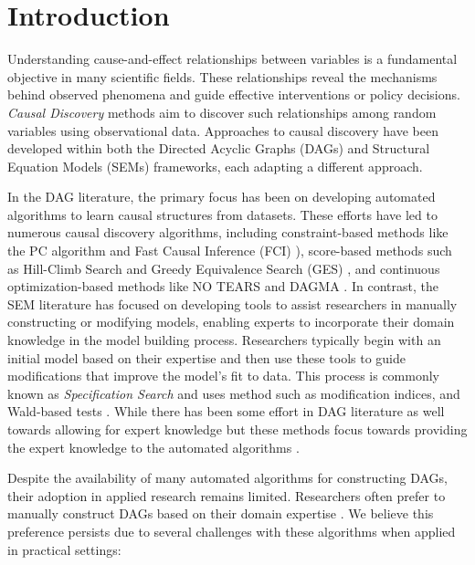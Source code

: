 \documentclass{uai2025} %
\begin{document}
\section{Introduction}
Understanding cause-and-effect relationships between variables is a fundamental
objective in many scientific fields. These relationships reveal the mechanisms
behind observed phenomena and guide effective interventions or policy
decisions. \emph{Causal Discovery} methods aim to discover such relationships
among random variables using observational data. Approaches to causal discovery
have been developed within both the Directed Acyclic Graphs (DAGs) and
Structural Equation Models (SEMs) frameworks, each adapting a different
approach.

In the DAG literature, the primary focus has been on developing automated
algorithms to learn causal structures from datasets. These efforts have led to
numerous causal discovery algorithms, including constraint-based methods like
the PC algorithm \citep{Spirtes2001} and Fast Causal Inference (FCI)
\citep{Spirtes2000}), score-based methods such as Hill-Climb Search and Greedy
Equivalence Search (GES) \citep{Chickering2002}, and continuous
optimization-based methods like NO TEARS \citep{Zheng2018} and DAGMA
\citep{Bello2022}. In contrast, the SEM literature has focused on developing
tools to assist researchers in manually constructing or modifying models,
enabling experts to incorporate their domain knowledge in the model building
process. Researchers typically begin with an initial model based on their
expertise and then use these tools to guide modifications that improve the
model's fit to data. This process is commonly known as \emph{Specification
Search} \citep{Long1983} and uses method such as modification indices, and
Wald-based tests \citep{Marcoulides2018}. While there has been some effort in
DAG literature as well towards allowing for expert knowledge but these methods
focus towards providing the expert knowledge to the automated algorithms
\citep{Bang2023, Meek1995}. 

Despite the availability of many automated algorithms for constructing DAGs,
their adoption in applied research remains limited. Researchers often prefer to
manually construct DAGs based on their domain expertise \citep{Tennant2020,
Petersen2021}. We believe this preference persists due to several challenges
with these algorithms when applied in practical settings:
\end{document}
